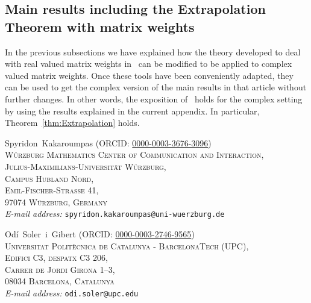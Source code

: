 \documentclass{article}
\makeatletter
\theoremstyle{definition}
\theoremstyle{remark}
\numberwithin{equation}{section}
\newcommand{\reals}{\mathbb{R}}
\newcommand{\complex}{\mathbb{C}}
\newcommand{\1}{\mathbf{1}}
\newcommand{\Addresses}{{%
  \medskip
  \footnotesize

  \noindent Spyridon~Kakaroumpas (ORCID: \href{https://orcid.org/0000-0003-3676-3096}{0000-0003-3676-3096})\\
  \textsc{W\"{u}rzburg Mathematics Center of Communication and Interaction,\\
          Julius-Maximilians-Universit\"{a}t W\"{u}rzburg,\\
          Campus Hubland Nord,\\
          Emil-Fischer-Stra{\ss}e 41,\\
          97074 W\"{u}rzburg, Germany}\\
  \textit{E-mail address: } \texttt{spyridon.kakaroumpas@uni-wuerzburg.de}

  \medskip

  \noindent Odí~Soler~i~Gibert (ORCID: \href{https://orcid.org/0000-0003-2746-9565}{0000-0003-2746-9565})\\
  \textsc{Universitat Politècnica de Catalunya - BarcelonaTech (UPC),\\
          Edifici C3, despatx C3 206,\\
          Carrer de Jordi Girona 1--3,\\
          08034 Barcelona, Catalunya}\\
  \textit{E-mail address: } \texttt{odi.soler@upc.edu}

}}
\makeatother
\begin{document}



    \subsection{Main results including the Extrapolation Theorem with matrix weights}
    In the previous subsections we have explained how the theory developed to deal with real valued matrix weights
    in~\cite[Sections~2--4]{Cruz_Uribe_Bownik_Extrapolation}
    can be modified to be applied to complex valued matrix weights.
    Once these tools have been conveniently adapted,
    they can be used to get the complex version of the main results in that article
    without further changes.
    In other words, the exposition of~\cite[Sections~5--9]{Cruz_Uribe_Bownik_Extrapolation}
    holds for the complex setting by using the results explained in the current appendix.
    In particular, Theorem~\ref{thm:Extrapolation} holds.
    
    \printbibliography

    \Addresses
\end{document}
